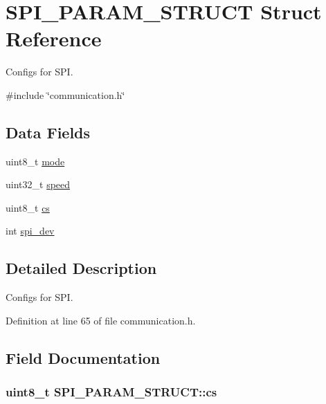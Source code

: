 \hypertarget{structSPI__PARAM__STRUCT}{\section{S\-P\-I\-\_\-\-P\-A\-R\-A\-M\-\_\-\-S\-T\-R\-U\-C\-T Struct Reference}
\label{structSPI__PARAM__STRUCT}
}


Configs for S\-P\-I.  




{\ttfamily \#include \char`\"{}communication.\-h\char`\"{}}

\subsection*{Data Fields}
\begin{DoxyCompactItemize}
\item 
uint8\-\_\-t \hyperlink{structSPI__PARAM__STRUCT_a82c546c99f6c3daed73c1e23426be847}{mode}
\item 
uint32\-\_\-t \hyperlink{structSPI__PARAM__STRUCT_a53a8d386594a81eb9bc6f971bfe36c54}{speed}
\item 
uint8\-\_\-t \hyperlink{structSPI__PARAM__STRUCT_ae0d62e0a5554783d710b677a017e246f}{cs}
\item 
int \hyperlink{structSPI__PARAM__STRUCT_abe385c44333d268d17cf648c8e371cad}{spi\-\_\-dev}
\end{DoxyCompactItemize}


\subsection{Detailed Description}
Configs for S\-P\-I. 

Definition at line 65 of file communication.\-h.



\subsection{Field Documentation}
\hypertarget{structSPI__PARAM__STRUCT_ae0d62e0a5554783d710b677a017e246f}{
\subsubsection[{cs}]{\setlength{\rightskip}{0pt plus 5cm}uint8\-\_\-t S\-P\-I\-\_\-\-P\-A\-R\-A\-M\-\_\-\-S\-T\-R\-U\-C\-T\-::cs}}\label{structSPI__PARAM__STRUCT_ae0d62e0a5554783d710b677a017e246f}


